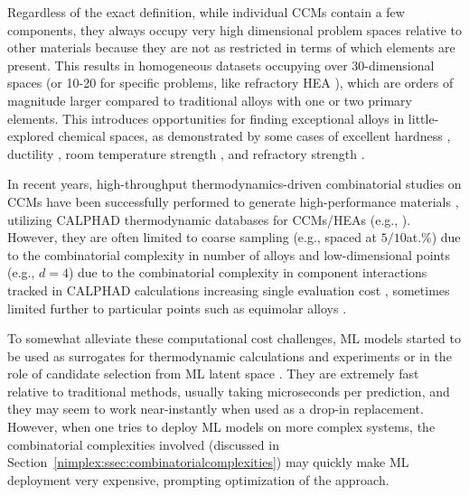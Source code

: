 Regardless of the exact definition, while individual CCMs contain a few components, they always occupy very high dimensional problem spaces relative to other materials because they are not as restricted in terms of which elements are present. This results in homogeneous datasets occupying over 30-dimensional spaces (or 10-20 for specific problems, like refractory HEA \cite{Senkov2019HighAlloys}), which are orders of magnitude larger compared to traditional alloys with one or two primary elements. This introduces opportunities for finding exceptional alloys in little-explored chemical spaces, as demonstrated by some cases of excellent hardness \cite{Senkov2010RefractoryAlloys}, ductility \cite{Zhang2019PrecipitationAlloy}, room temperature strength \cite{Long2019AProperties}, and refractory strength \cite{Senkov2016DevelopmentSuperalloy, Kang2021SuperiorProcess}. 

In recent years, high-throughput thermodynamics-driven combinatorial studies on CCMs have been successfully performed to generate high-performance materials \cite{Elder2023ComputationalValidation, Elder2023ComputationalDown-selection}, utilizing  CALPHAD thermodynamic databases for CCMs/HEAs (e.g., \cite{Ostrowska2020ThermodynamicW, Ostrowska2022ThermodynamicExperiments, GambaroCombinedAlloys}). However, they are often limited to coarse sampling (e.g., spaced at $5/10$at.\%) due to the combinatorial complexity in number of alloys and low-dimensional points (e.g., $d=4$) due to the combinatorial complexity in component interactions tracked in CALPHAD calculations increasing single evaluation cost \cite{Elder2023ComputationalValidation, Elder2023ComputationalDown-selection}, sometimes limited further to particular points such as equimolar alloys \cite{Yan2021AcceleratedLearning}.


To somewhat alleviate these computational cost challenges, ML models started to be used as surrogates for thermodynamic calculations and experiments \cite{Debnath2023ComparingAlloys, Tandoc2023MiningAlloys} or in the role of candidate selection from ML latent space \cite{Rao2022MachineDiscovery}. They are extremely fast relative to traditional methods, usually taking microseconds per prediction, and they may seem to work near-instantly when used as a drop-in replacement. However, when one tries to deploy ML models on more complex systems, the combinatorial complexities involved (discussed in Section~\ref{nimplex:ssec:combinatorialcomplexities}) may quickly make ML deployment very expensive, prompting optimization of the approach. 

